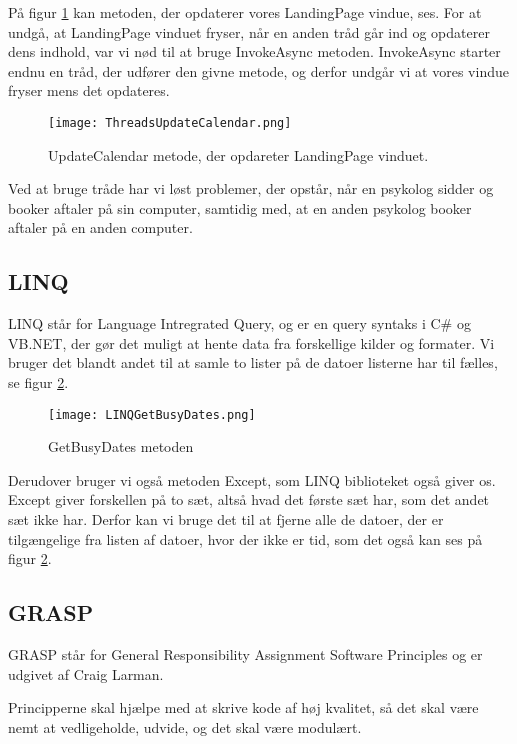 På figur \ref{fig:threadsWPF} kan metoden, der opdaterer vores LandingPage vindue, ses.
For at undgå, at LandingPage vinduet fryser, når en anden tråd går ind og opdaterer dens indhold, var vi nød til at bruge InvokeAsync metoden.
InvokeAsync starter endnu en tråd, der udfører den givne metode, og derfor undgår vi at vores vindue fryser mens det opdateres.

\begin{figure}[H]
    \caption{UpdateCalendar metode, der opdareter LandingPage vinduet.}
    \centering
        \texttt{[image: ThreadsUpdateCalendar.png]}
    \label{fig:threadsWPF}
\end{figure}

Ved at bruge tråde har vi løst problemer, der opstår, når en psykolog sidder og booker aftaler på sin computer, samtidig med, at en anden psykolog booker aftaler på en anden computer.

\subsection{LINQ}

LINQ står for Language Intregrated Query, og er en query syntaks i C\# og VB.NET, der gør det muligt at hente data fra forskellige kilder og formater.
Vi bruger det blandt andet til at samle to lister på de datoer listerne har til fælles, se figur \ref{fig:LINQGetBusyDates}.

\begin{figure}[h]
    \caption{GetBusyDates metoden}
    \centering
        \texttt{[image: LINQGetBusyDates.png]}
    \label{fig:LINQGetBusyDates}
\end{figure}

Derudover bruger vi også metoden Except, som LINQ biblioteket også giver os.
Except giver forskellen på to sæt, altså hvad det første sæt har, som det andet sæt ikke har.
Derfor kan vi bruge det til at fjerne alle de datoer, der er tilgængelige fra listen af datoer, hvor der ikke er tid, som det også kan ses på figur \ref{fig:LINQGetBusyDates}.

\subsection{GRASP}
\label{grasp}
GRASP står for General Responsibility Assignment Software Principles og er udgivet af Craig Larman.\cite{larman}

Principperne skal hjælpe med at skrive kode af høj kvalitet, så det skal være nemt at vedligeholde, udvide, og det skal være modulært.

